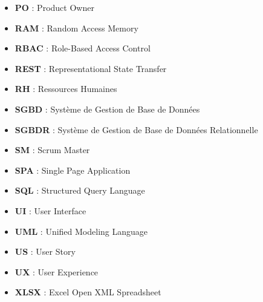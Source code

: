 \begin{itemize}
    \item \textbf{PO} : Product Owner
    \item \textbf{RAM} : Random Access Memory
    \item \textbf{RBAC} : Role-Based Access Control
    \item \textbf{REST} : Representational State Transfer
    \item \textbf{RH} : Ressources Humaines
    \item \textbf{SGBD} : Système de Gestion de Base de Données
    \item \textbf{SGBDR} : Système de Gestion de Base de Données Relationnelle
    \item \textbf{SM} : Scrum Master
    \item \textbf{SPA} : Single Page Application
    \item \textbf{SQL} : Structured Query Language
    \item \textbf{UI} : User Interface
    \item \textbf{UML} : Unified Modeling Language
    \item \textbf{US} : User Story
    \item \textbf{UX} : User Experience
    \item \textbf{XLSX} : Excel Open XML Spreadsheet
\end{itemize}
